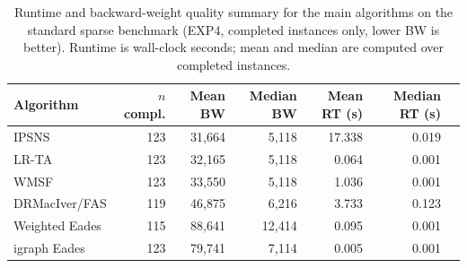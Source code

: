 \begin{table}[htbp]
\centering
\caption{Runtime and backward-weight quality summary for the main algorithms
on the standard sparse benchmark (EXP4, completed instances only, lower BW is better).
Runtime is wall-clock seconds; mean and median are computed over completed instances.}
\label{tab:runtime_quality_tradeoff}
\small
\begin{tabular}{lrrrrrr}
\toprule
Algorithm & $n$ compl. & Mean BW & Median BW & Mean RT (s) & Median RT (s) \\
\midrule
IPSNS & 123 & 31,664 & 5,118 & 17.338 & 0.019 \\
LR-TA & 123 & 32,165 & 5,118 & 0.064 & 0.001 \\
WMSF & 123 & 33,550 & 5,118 & 1.036 & 0.001 \\
DRMacIver/FAS & 119 & 46,875 & 6,216 & 3.733 & 0.123 \\
Weighted Eades & 115 & 88,641 & 12,414 & 0.095 & 0.001 \\
igraph Eades & 123 & 79,741 & 7,114 & 0.005 & 0.001 \\
\bottomrule
\end{tabular}
\end{table}
